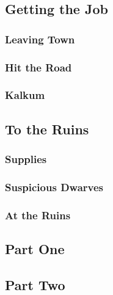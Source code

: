 

\subsection{Getting the Job}


\subsubsection{Leaving Town}


\subsubsection{Hit the Road}


\subsubsection{Kalkum}


\subsection{To the Ruins}


\subsubsection{Supplies}


\subsubsection{Suspicious Dwarves}


\subsubsection{At the Ruins}


\subsection{Part One}


\subsection{Part Two}


